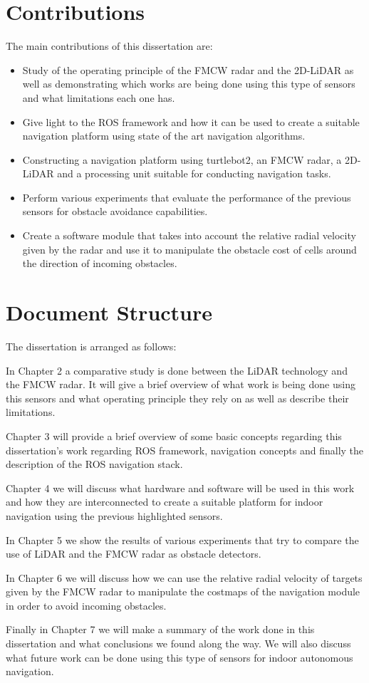\section{Contributions}
The main contributions of this dissertation are:
\begin{itemize}
    \item Study of the operating principle of the \ac{FMCW} \ac{radar} and the 2D-\ac{LiDAR} as well as demonstrating which works are being done using this type of sensors and what limitations each one has.
    \item Give light to the \ac{ROS} framework and how it can be used to create a suitable navigation platform using state of the art navigation algorithms.
    \item Constructing a navigation platform using turtlebot2, an \ac{FMCW} \ac{radar}, a 2D- \ac{LiDAR} and a processing unit suitable for conducting navigation tasks.
    \item Perform various experiments that evaluate the performance of the previous sensors for obstacle avoidance capabilities.
    \item Create a software module that takes into account the relative radial velocity given by the \ac{radar} and use it to manipulate the obstacle cost of cells around the direction of incoming obstacles.
\end{itemize}




\section{Document Structure}
The dissertation is arranged as follows:

In Chapter 2 a comparative study is done between the \ac{LiDAR} technology and the \ac{FMCW} \ac{radar}. It will give a brief overview of what work is being done using this sensors and what operating principle they rely on as well as describe their limitations.

Chapter 3 will provide a brief overview of some basic concepts regarding this dissertation's work regarding \ac{ROS} framework, navigation concepts and finally the description of the \ac{ROS} navigation stack.

Chapter 4 we will discuss what hardware and software will be used in this work and how they are interconnected to create a suitable platform for indoor navigation using the previous highlighted sensors.

In Chapter 5 we show the results of various experiments that try to compare the use of \ac{LiDAR} and the \ac{FMCW} \ac{radar} as obstacle detectors.

In Chapter 6 we will discuss how we can use the relative radial velocity of targets given by the \ac{FMCW} \ac{radar} to manipulate the costmaps of the navigation module in order to avoid incoming obstacles.

Finally in Chapter 7 we will make a summary of the work done in this dissertation and what conclusions we found along the way. We will also discuss what future work can be done using this type of sensors for indoor autonomous navigation.



